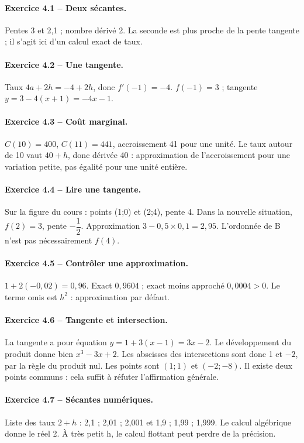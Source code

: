 \paragraph{Exercice 4.1 -- Deux sécantes.} Pentes 3 et 2,1 ; nombre dérivé 2. La seconde est plus proche de la pente tangente ; il s’agit ici d’un calcul exact de taux.
\paragraph{Exercice 4.2 -- Une tangente.} Taux $4a+2h=-4+2h$, donc $f\prime(-1)=-4$. $f(-1)=3$ ; tangente $y=3-4(x+1)=-4x-1$.
\paragraph{Exercice 4.3 -- Coût marginal.} $C(10)=400$, $C(11)=441$, accroissement 41 pour une unité. Le taux autour de 10 vaut $40+h$, donc dérivée 40 : approximation de l’accroissement pour une variation petite, pas égalité pour une unité entière.
\paragraph{Exercice 4.4 -- Lire une tangente.} Sur la figure du cours : points (1;0) et (2;4), pente 4. Dans la nouvelle situation, $f(2)=3$, pente $-\dfrac{1}{2}$. Approximation $3-0{,}5\times0{,}1=2{,}95$. L’ordonnée de B n’est pas nécessairement $f(4)$.
\paragraph{Exercice 4.5 -- Contrôler une approximation.} $1+2(-0{,}02)=0{,}96$. Exact $0{,}9604$ ; exact moins approché $0{,}0004>0$. Le terme omis est $h^2$ : approximation par défaut.
\paragraph{Exercice 4.6 -- Tangente et intersection.} La tangente a pour équation $y=1+3(x-1)=3x-2$. Le développement du produit donne bien $x^3-3x+2$. Les abscisses des intersections sont donc 1 et $-2$, par la règle du produit nul. Les points sont $(1;1)$ et $(-2;-8)$. Il existe deux points communs : cela suffit à réfuter l’affirmation générale.
\paragraph{Exercice 4.7 -- Sécantes numériques.} Liste des taux $2+h$ : 2,1 ; 2,01 ; 2,001 et 1,9 ; 1,99 ; 1,999. Le calcul algébrique donne le réel 2. À très petit h, le calcul flottant peut perdre de la précision.
